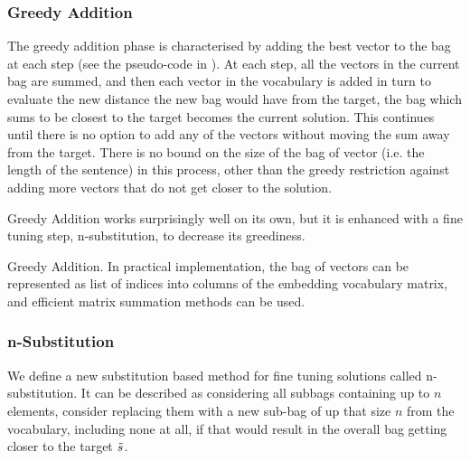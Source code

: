 {\subsubsection{Greedy Addition}
The greedy addition phase is characterised by adding the best vector to the bag at each step (see the pseudo-code in ). At each step, all the vectors in the current bag are summed, and then each vector in the vocabulary is added in turn to evaluate the new distance the new bag would have from the target, the bag which sums to be closest to the target  becomes the current solution. This continues until there is no option to add any of the vectors without moving the sum away from the target. There is no bound on the size of the bag of vector (i.e. the length of the sentence) in this process, other than the greedy restriction against adding more vectors that do not get closer to the solution.

Greedy Addition works surprisingly well on its own, but it is enhanced with a fine tuning step, n-substitution, to decrease its greediness.

\begin{algorithm}
	\SetAlgoLined
\caption{Greedy Addition. In practical implementation, the bag of vectors can be represented as list of indices into columns of the embedding vocabulary matrix, and efficient matrix summation methods can be used.}
\label{pseudocode:greedyaddition}
\end{algorithm}


\subsubsection{n-Substitution}
We define a new substitution based method for fine tuning solutions called n-substitution. It can be described as considering all subbags containing up to $n$ elements, consider replacing them with a new sub-bag of up that size $n$ from the vocabulary, including none at all, if that would result in the overall bag getting closer to the target $\tilde{s}$. 

}
